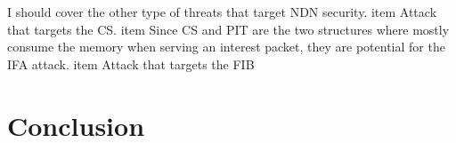 \documentclass[conference]{IEEEtran}
\begin{document}
\cite{8352953}
\cite{8247232}

\cite{Xin2016ANI}
\cite{Zhang:2014:NDN:2656877.2656887}
\cite{Compagno2013}



\cite{Abdallah2015} 
\cite{Zhao2018}


    I should cover the other type of threats that target NDN security. 
    item Attack that targets the CS.
    item Since CS and PIT are the two structures where mostly consume the memory when serving an interest packet, they are potential for the IFA attack. 
    item Attack that targets the FIB 

\section{Conclusion}






\end{document}
